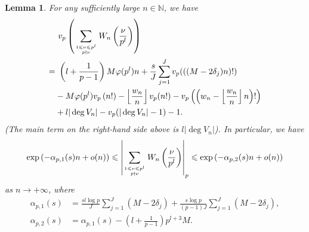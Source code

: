 \documentclass[12pt]{article}
\newtheorem{lemma}[theorem]{Lemma}
\numberwithin{equation}{section}
\begin{document}
\begin{lemma}\label{lem_p_adic_order_of_sum_W}
For any sufficiently large $n \in \mathbb{N}$, we have
\begin{align}
&~v_p\left( \sum_{1 \leqslant \nu \leqslant p^l \atop p \nmid \nu} W_n\left( \frac{\nu}{p^l} \right) \right) \notag\\ 
=&~ \left( l + \frac{1}{p-1} \right)M\varphi(p^l)n + \frac{s}{J} \sum_{j=1}^{J} v_p(((M-2\delta_j)n)!) \notag\\ 
&- M\varphi(p^l)v_p\left( n! \right) - \left\lfloor \frac{w_n}{n} \right\rfloor v_p(n!) - v_p\left( \left( w_n -\left\lfloor \frac{w_n}{n} \right\rfloor n \right)! \right) \notag\\
&+ l|\deg V_n|  - v_p(|\deg V_n| - 1) - 1. \label{v_p(sumWn)}
\end{align}
(The main term on the right-hand side above is $l|\deg V_n|$). In particular, we have
\begin{equation}\label{p_adic_norm_of_sumWn}
 \exp\left( -\alpha_{p,1}(s)n + o(n) \right) \leqslant \left| \sum_{1 \leqslant \nu \leqslant p^l \atop p \nmid \nu} W_n\left( \frac{\nu}{p^l} \right) \right|_p \leqslant \exp\left( -\alpha_{p,2}(s)n + o(n) \right)
\end{equation} 
as $n \to +\infty$, where
\begin{align}
	\alpha_{p,1}(s) &= \frac{sl\log p}{J} \sum_{j=1}^{J} (M-2\delta_j) + \frac{s\log p}{(p-1)J}\sum_{j=1}^{J} (M-2\delta_j),  \label{defi_alpha_1}\\
	\alpha_{p,2}(s) &= \alpha_{p,1}(s) - \left( l+\frac{1}{p-1}\right)p^{l+3}M. \label{defi_alpha_2}
\end{align}
\end{lemma}
\end{document}
